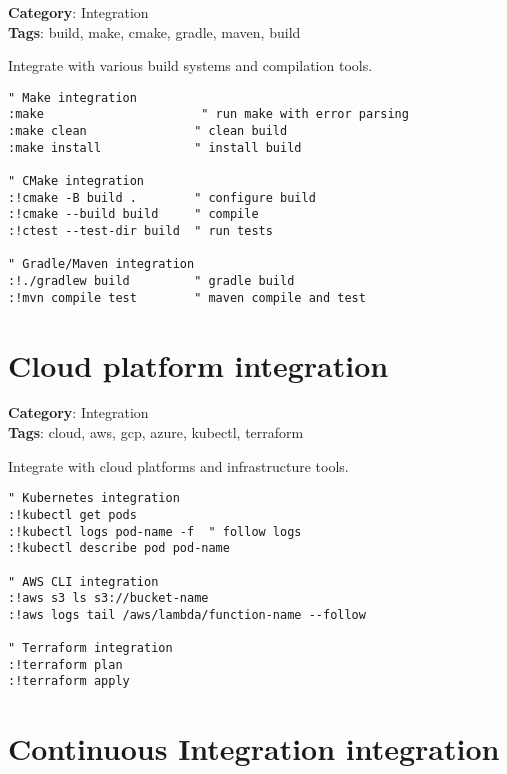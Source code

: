 {{{{{\textbf{Category}: Integration\\ \textbf{Tags}: build, make, cmake, gradle, maven, build
\vspace{0.5cm}

Integrate with various build systems and compilation tools.

\begin{Exa*}{}
\begin{Verbatim}[fontsize=\footnotesize, breaklines, breakanywhere]
" Make integration
:make                      " run make with error parsing
:make clean               " clean build
:make install             " install build

" CMake integration  
:!cmake -B build .        " configure build
:!cmake --build build     " compile
:!ctest --test-dir build  " run tests

" Gradle/Maven integration
:!./gradlew build         " gradle build
:!mvn compile test        " maven compile and test
\end{Verbatim}
\end{Exa*}

\section{Cloud platform integration}

\textbf{Category}: Integration\\ \textbf{Tags}: cloud, aws, gcp, azure, kubectl, terraform
\vspace{0.5cm}

Integrate with cloud platforms and infrastructure tools.

\begin{Exa*}{}
\begin{Verbatim}[fontsize=\footnotesize, breaklines, breakanywhere]
" Kubernetes integration
:!kubectl get pods
:!kubectl logs pod-name -f  " follow logs
:!kubectl describe pod pod-name

" AWS CLI integration
:!aws s3 ls s3://bucket-name
:!aws logs tail /aws/lambda/function-name --follow

" Terraform integration
:!terraform plan
:!terraform apply
\end{Verbatim}
\end{Exa*}

\section{Continuous Integration integration}

}}}}}
